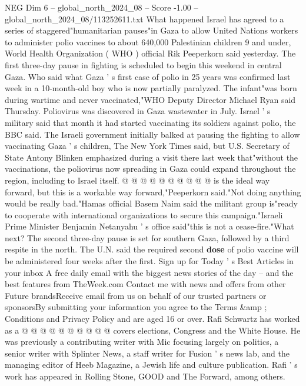 \begin{textsample}{NEG Dim 6 – global\_north\_2024\_08 – Score -1.00 – global\_north\_2024\_08/113252611.txt}  \label{ex:f6_neg_073}
What happened Israel has agreed to a series of staggered"humanitarian pauses"in Gaza to allow United Nations workers to administer polio vaccines to about 640,000 Palestinian children 9 and under, World Health Organization ( WHO ) official Rik Peeperkorn said yesterday.
The first three-day pause in fighting is scheduled to begin this weekend in central Gaza.
Who said what Gaza ' s first case of polio in 25 years was confirmed last week in a 10-month-old boy who is now partially paralyzed.
The infant"was born during wartime and never vaccinated,"WHO Deputy Director Michael Ryan said Thursday.
Poliovirus was discovered in Gaza wastewater in July.
Israel ' s military said that month it had started vaccinating its soldiers against polio, the BBC said.
The Israeli government initially balked at pausing the fighting to allow vaccinating Gaza ' s children, The New York Times said, but U.S.
Secretary of State Antony Blinken emphasized during a visit there last week that"without the vaccinations, the poliovirus now spreading in Gaza could expand throughout the region, including to Israel itself. @ @ @ @ @ @ @ @ @ @ is the ideal way forward, but this is a workable way forward,"Peeperkorn said."Not doing anything would be really bad."Hamas official Basem Naim said the militant group is"ready to cooperate with international organizations to secure this campaign."Israeli Prime Minister Benjamin Netanyahu ' s office said"this is not a cease-fire."What next?
The second three-day pause is set for southern Gaza, followed by a third respite in the north.
The U.N. said the required second \textbf{dose} of polio vaccine will be administered four weeks after the first.
Sign up for Today ' s Best Articles in your inbox A free daily email with the biggest news stories of the day -- and the best features from TheWeek.com Contact me with news and offers from other Future brandsReceive email from us on behalf of our trusted partners or sponsorsBy submitting your information you agree to the Terms \&amp ; Conditions and Privacy Policy and are aged 16 or over.
Rafi Schwartz has worked as a @ @ @ @ @ @ @ @ @ @ covers elections, Congress and the White House.
He was previously a contributing writer with Mic focusing largely on politics, a senior writer with Splinter News, a staff writer for Fusion ' s news lab, and the managing editor of Heeb Magazine, a Jewish life and culture publication.
Rafi ' s work has appeared in Rolling Stone, GOOD and The Forward, among others.

\end{textsample}
